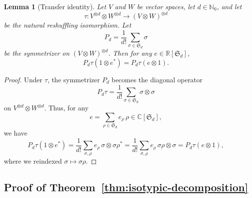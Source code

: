 \documentclass[11pt]{article}
\newcommand{\dsC}{\mathbb{C}}
\newcommand{\dsN}{\mathbb{N}}
\newcommand{\dsR}{\mathbb{R}}
\newtheorem{lemma}[theorem]{Lemma}
\theoremstyle{definition}
\begin{document}
\begin{lemma}[Transfer identity]\label{lem:cauchy-transfer}
  Let $V$ and $W$ be vector spaces, let $d\in\dsN_0$, and let
  \[
    \tau:V^{\otimes d}\otimes W^{\otimes d}\longrightarrow (V\otimes W)^{\otimes d}
  \]
  be the natural reshuffling isomorphism.
  Let
  \[
    P_d=\frac{1}{d!}\sum_{\sigma\in\mathfrak S_d}\sigma
  \]
  be the symmetrizer on $(V\otimes W)^{\otimes d}$.
  Then for any $e\in \dsR[\mathfrak S_d]$,
  \[
    P_d\tau(1\otimes e^*)
    =
    P_d\tau(e\otimes 1).
  \]
\end{lemma}
\begin{proof}
  Under $\tau$, the symmetrizer $P_d$ becomes the diagonal operator
  \[
    P_d\tau=\frac{1}{d!}\sum_{\sigma\in\mathfrak S_d}\sigma\otimes\sigma
  \]
  on $V^{\otimes d}\otimes W^{\otimes d}$.
  Thus, for any
  \[
    e=\sum_{\rho\in\mathfrak S_d} e_\rho\,\rho \in \dsC[\mathfrak S_d],
  \]
  we have
  \[
    P_d\tau(1\otimes e^*)
    =
    \frac{1}{d!}\sum_{\sigma,\rho} e_\rho\,\sigma\otimes \sigma\rho^*
    =
    \frac{1}{d!}\sum_{\sigma,\rho} e_\rho\,\sigma\rho\otimes \sigma
    =
    P_d\tau(e\otimes 1),
  \]
  where we reindexed $\sigma\mapsto \sigma\rho$.
\end{proof}

\subsection{Proof of Theorem~\ref{thm:isotypic-decomposition}}\label{sec:proof-main-decomposition}
\end{document}

